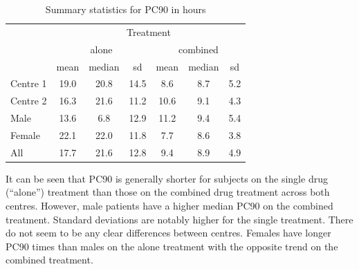 \begin{table}
\centering
\caption{Summary statistics for PC90 in hours}\label{summaryPC90}
\begin{tabular}{|l|ccc|ccc|}
\hline
&\multicolumn{6}{c|}{Treatment}\\
&\multicolumn{3}{c|}{alone}&\multicolumn{3}{c|}{combined}\\
&mean&median&sd&mean&median&sd\\
\hline
Centre 1	& 19.0 & 20.8 & 14.5 & 8.6  &  8.7  &  5.2 \\
Centre 2	& 16.3  & 21.6 &  11.2 & 10.6  &  9.1  &  4.3 \\
\hline
Male		& 13.6  &  6.8 & 12.9 & 11.2  &  9.4 &   5.4 \\
Female	& 22.1  & 22.0 &  11.8 & 7.7  &  8.6  &  3.8  \\
\hline
All		& 17.7  & 21.6 &  12.8 & 9.4  &  8.9  &  4.9  \\
\hline 
\end{tabular}
\end{table}

It can be seen that PC90 is generally shorter for subjects on the single drug (``alone'') treatment than those on the combined drug treatment across both centres. However, male patients have a higher median PC90 on the combined treatment. Standard deviations are notably higher for the single treatment. There do not seem to be any clear differences between centres. Females have longer PC90 times than males on the alone treatment with the opposite trend on the combined treatment.

